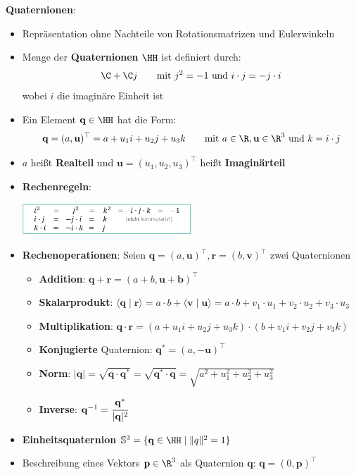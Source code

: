 \bigskip
\textbf{Quaternionen}:
\begin{itemize}
	\item Repräsentation ohne Nachteile von Rotationsmatrizen und Eulerwinkeln
	\item Menge der \textbf{Quaternionen} $\HH$ ist definiert durch:
	$$\C+\C j\qquad \text{mit } j^2=-1 \text{ und } i\cdot j=-j\cdot i$$
	wobei $i$ die imaginäre Einheit ist
	\item Ein Element $\mathbf{q}\in\HH$ hat die Form:
	$$\mathbf{q}=(a,\mathbf{u})^\top=a+u_1i+u_2j+u_3k\qquad \text{mit } a\in\R,\mathbf{u}\in\R^3\text{ und }k=i\cdot j$$
	\item $a$ heißt \textbf{Realteil} und $\mathbf{u}=(u_1,u_2,u_3)^\top$ heißt \textbf{Imaginärteil}
	\item \textbf{Rechenregeln}:
	\begin{center}
		\includegraphics[width=0.5\textwidth]{images/quaternionen.png}
	\end{center}
	\item \textbf{Rechenoperationen}: Seien $\mathbf{q}=(a,\mathbf{u})^\top, \mathbf{r}=(b,\mathbf{v})^\top$ zwei Quaternionen
	\begin{itemize}
		\item \textbf{Addition}: $\mathbf{q}+\mathbf{r}=(a+b,\mathbf{u}+\mathbf{b})^\top$
		\item \textbf{Skalarprodukt}: $\langle \mathbf{q}\mid\mathbf{r}\rangle=a\cdot b+\langle \mathbf{v}\mid\mathbf{u}\rangle=a\cdot b+v_1\cdot u_1+v_2\cdot u_2+v_3\cdot u_3$
		\item \textbf{Multiplikation}: $\mathbf{q}\cdot\mathbf{r}=(a+u_1i+u_2j+u_3k)\cdot (b+v_1i+v_2j+v_3k)$
		\item \textbf{Konjugierte} Quaternion: $\mathbf{q^*}=(a,-\mathbf{u})^\top$
		\item \textbf{Norm}: $|\mathbf{q}|=\sqrt{\mathbf{q}\cdot\mathbf{q^*}}=\sqrt{\mathbf{q^*}\cdot\mathbf{q}}=\sqrt{a^2+u_1^2+u_2^2+u_3^2}$
		\item \textbf{Inverse}: $\mathbf{q}^{-1}=\cfrac{\mathbf{q^*}}{|\mathbf{q}|^2}$
	\end{itemize}
	\item \textbf{Einheitsquaternion} $\mathbb{S}^3=\{\mathbf{q}\in\HH\mid\lVert q \rVert^2=1\}$
	\item Beschreibung eines Vektors $\mathbf{p}\in\R^3$ als Quaternion $\mathbf{q}$: $\mathbf{q}=(0,\mathbf{p})^\top$

\end{itemize}
